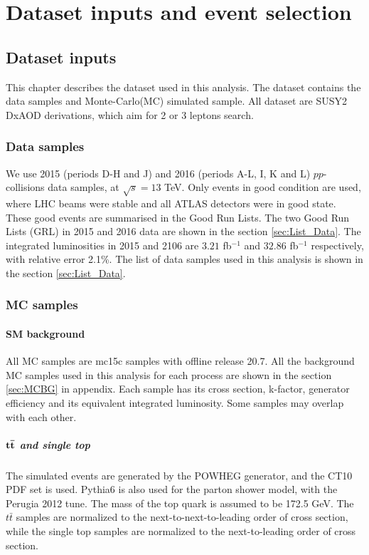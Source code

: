 \chapter{Dataset inputs and event selection}
\label{ch:event}

\section{Dataset inputs}
This chapter describes the dataset used in this analysis.
The dataset contains the data samples and Monte-Carlo(MC) simulated sample.
All dataset are SUSY2 DxAOD derivations, which aim for 2 or 3 leptons search.

\subsection{Data samples}
We use 2015 (periods D-H and J) and 2016 (periods A-L, I, K and L) $pp$-collisions data samples, at $\sqrt s=13$ TeV.
Only events in good condition are used, where LHC beams were stable and all ATLAS detectors were in good state.
These good events are summarised in the Good Run Lists.
The two Good Run Lists (GRL) in 2015 and 2016 data are shown in the section \ref{sec:List_Data}.
The integrated luminosities in 2015 and 2106 are $3.21$ fb$^{-1}$ and $32.86$ fb$^{-1}$ respectively, with relative error 2.1\%.
The list of data samples used in this analysis is shown in the section \ref{sec:List_Data}.

\subsection{MC samples}
\subsubsection{SM background}
All MC samples are mc15c samples with offline release 20.7.
All the background MC samples used in this analysis for each process are shown in the section \ref{sec:MCBG} in appendix.
Each sample has its cross section, k-factor, generator efficiency and its equivalent integrated luminosity.
Some samples may overlap with each other.

\paragraph{$\bf t\bar{t}$ and single top}
The simulated events are generated by the {\sc POWHEG} generator, and the CT10 PDF set is used.
{\sc Pythia6} is also used for the parton shower model, with the {\sc Perugia} 2012 tune.
The mass of the top quark is assumed to be 172.5 GeV.
The $t\bar{t}$ samples are normalized to the next-to-next-to-leading order of cross section, while the single top samples are normalized to the next-to-leading order of cross section.

